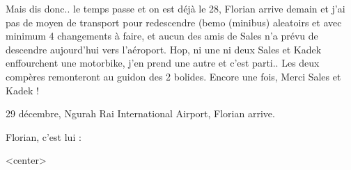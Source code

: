 \begin{multicols}{2}


Mais dis donc.. le temps passe et on est déjà le 28, Florian arrive demain et j'ai pas de moyen de transport pour redescendre (bemo (minibus) aleatoirs et avec minimum 4 changements à faire, et aucun des amis de Sales n'a prévu de descendre aujourd'hui vers l'aéroport. Hop, ni une ni deux Sales et Kadek enffourchent une motorbike, j'en prend une autre et c'est parti.. Les deux compères remonteront au guidon des 2 bolides. Encore une fois, Merci Sales et Kadek !

29 décembre, Ngurah Rai International Airport, Florian arrive.

Florian, c'est lui :

<center>%

\end{multicols}
